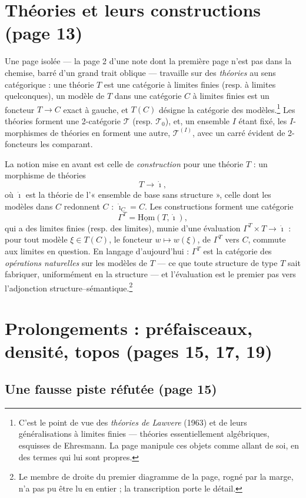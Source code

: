 \documentclass[11pt,a4paper]{article}
\begin{document}
\section*{Théories et leurs constructions (page 13)}

Une page isolée — la page 2 d'une note dont la première page n'est pas
dans la chemise, barré d'un grand trait oblique — travaille sur des
\emph{théories} au sens catégorique : une théorie $T$ est une catégorie à
limites finies (resp. à limites quelconques), un modèle de $T$ dans une
catégorie $C$ à limites finies est un foncteur $T \to C$ exact à gauche, et
$T(C)$ désigne la catégorie des modèles.\footnote{C'est le point de vue des
\emph{théories de Lawvere} (1963) et de leurs généralisations à limites
finies — théories essentiellement algébriques, esquisses de Ehresmann. La page manipule ces objets comme allant de soi, en des termes qui lui
sont propres.} Les théories forment une 2-catégorie $\mathcal{T}$ (resp.
$\mathcal{T}_0$), et, un ensemble $I$ étant fixé, les $I$-morphismes de
théories en forment une autre, $\mathcal{T}^{(I)}$, avec un carré évident
de 2-foncteurs les comparant.

La notion mise en avant est celle de \emph{construction} pour une théorie
$T$ : un morphisme de théories
\[
T \longrightarrow \dot{\imath},
\]
où $\dot{\imath}$ est la théorie de l'« ensemble de base sans structure »,
celle dont les modèles dans $C$ redonnent $C$ : $\dot{\imath}_C = C$. Les
constructions forment une catégorie
\[
\Gamma^{T} = \underline{\mathrm{Hom}}(T, \dot{\imath}),
\]
qui a des limites finies (resp. des limites), munie d'une évaluation
$\Gamma^{T} \times T \to \dot{\imath}$ : pour tout modèle $\xi \in T(C)$,
le foncteur $w \mapsto w(\xi)$, de $\Gamma^{T}$ vers $C$, commute aux
limites en question. En langage d'aujourd'hui : $\Gamma^{T}$ est la
catégorie des \emph{opérations naturelles} sur les modèles de $T$ — ce que
toute structure de type $T$ sait fabriquer, uniformément en la structure —
et l'évaluation est le premier pas vers l'adjonction
structure--sémantique.\footnote{Le membre de droite du premier diagramme de la page, rogné par la marge, n'a pas pu être lu en entier ; la
transcription porte le détail.}

\section*{Prolongements : préfaisceaux, densité, topos (pages 15, 17, 19)}

\subsection*{Une fausse piste réfutée (page 15)}
\end{document}
